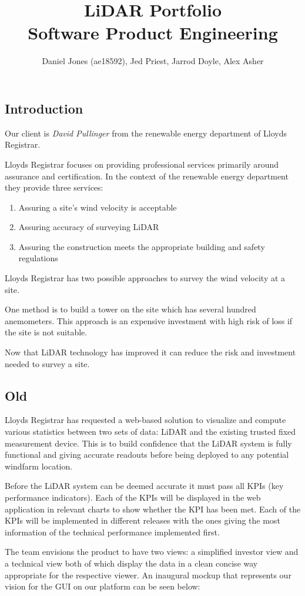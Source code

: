 \documentclass{article}
\title{LiDAR Portfolio\\\large Software Product Engineering}
\author{Daniel Jones (ae18592), Jed Priest, Jarrod Doyle, Alex Asher}
\date{}
\begin{document}
\maketitle
\begin{multicols}{2}
    \section{Introduction}
    Our client is \textit{David Pullinger} from the renewable energy department of Lloyds Registrar.
    \par Lloyds Registrar focuses on providing professional services primarily around assurance and certification. In the context of the renewable energy department they provide three services:
    \begin{enumerate}
        \item Assuring a site's wind velocity is acceptable
        \item Assuring accuracy of surveying LiDAR
        \item Assuring the construction meets the appropriate building and safety regulations
    \end{enumerate}
    Lloyds Registrar has two possible approaches to survey the wind velocity at a site. 
    \par One method is to build a tower on the site which has several hundred anemometers. This approach is an expensive investment with high risk of loss if the site is not suitable.
    \par Now that LiDAR technology has improved it can reduce the risk and investment needed to survey a site. 



    \subsection{Old}
    Lloyds Registrar has requested a web-based solution to visualize and compute various statistics between two sets of data: LiDAR and the existing trusted fixed measurement device. This is to build confidence that the LiDAR system is fully functional and giving accurate readouts before being deployed to any potential windfarm location.
\par Before the LiDAR system can be deemed accurate it must pass all KPIs (key performance indicators). Each of the KPIs will be displayed in the web application in relevant charts to show whether the KPI has been met. Each of the KPIs will be implemented in different releases with the ones giving the most information of the technical performance implemented first.
\par The team envisions the product to have two views: a simplified investor view and a technical view both of which display the data in a clean concise way appropriate for the respective viewer. An inaugural mockup that represents our vision for the GUI on our platform can be seen below:
    

\end{multicols}
\end{document}
